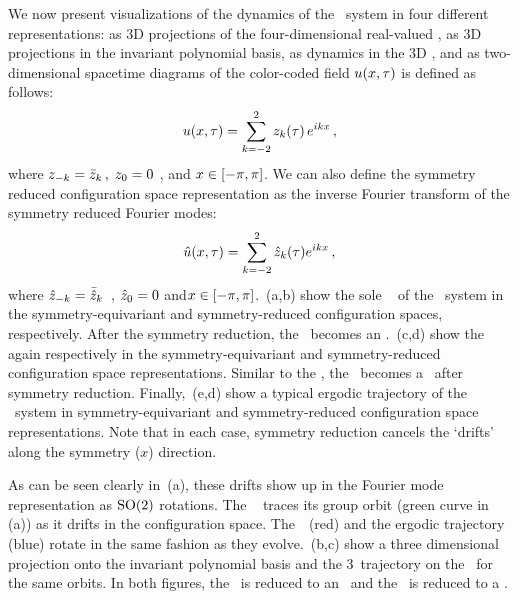\documentclass[aip,cha,
reprint,
secnumarabic,
nofootinbib, tightenlines,
nobibnotes, showkeys, showpacs,
superscriptaddress,
]{revtex4-1}
\begin{document}
We now present visualizations of the dynamics of the \twomode\ system in
four different representations: as 3D projections of the four-dimensional
real-valued \statesp, as 3D projections in the invariant polynomial
basis, as dynamics in the 3D \slicePlane, and as two-dimensional
spacetime diagrams of the color-coded field
$u(x,\tau)$
is defined as follows:
\[
	u(x, \tau) = \sum_{k=-2}^{2} z_k(\tau) \, e^{i k x}
\,,
\]
where $z_{-k} = \bar{z}_k \,, \; 	z_0 = 0$ ,  and $x
\in [- \pi, \pi]$. We can also define the symmetry reduced configuration
space representation as the inverse Fourier transform of the symmetry
reduced Fourier modes:
\[
	\hat{u}(x, \tau) = \sum_{k=-2}^{2} \hat{z}_k(\tau) e^{i k x}
\,,
\]
where $\hat{z}_{-k} = \bar{\hat{z}}_k$ \,, \; 	$\hat{z}_0 = 0$ \;
and$x \in [- \pi, \pi]$. \,(a,b) show the
sole \reqv\ \REQV{}{} of the \twomode\ system in the symmetry-equivariant
and symmetry-reduced configuration spaces, respectively. After the
symmetry reduction, the \reqv\ becomes an \eqv.
\,(c,d) show the \rpo\  again
respectively in the symmetry-equivariant and symmetry-reduced
configuration space representations. Similar to the \reqv, the \rpo\
becomes a \po\ after symmetry reduction. Finally,
\,(e,d) show a typical ergodic trajectory of the
\twomode\ system in symmetry-equivariant and symmetry-reduced
configuration space representations. Note that in each case, symmetry
reduction cancels the `drifts' along the symmetry ($x$) direction.

As can be seen clearly in \,(a), these drifts show up in
the Fourier mode representation as $$ rotations. The \reqv\ \REQV{}{}
traces its \SOn{2} group orbit (green curve in \reffig{fig:2modes-ssp}\,(a))
as it drifts in the configuration space. The
\rpo\ \,(red) and the ergodic trajectory (blue) rotate
in the same fashion as they evolve. \refFig{fig:2modes-ssp}\,(b,c)
show a three dimensional projection onto the invariant polynomial basis and the 3\dmn\
trajectory on the \slicePlane\ for the same orbits. In both figures, the \reqv\ is reduced
to an \eqv\ and the \rpo\ is reduced to a \po.

%
%
%
\end{document}
